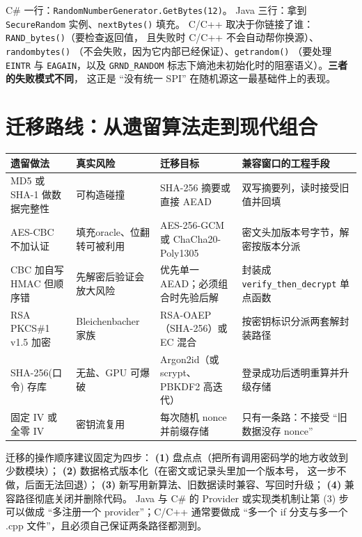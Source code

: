\documentclass[12pt,a4paper,fontset=fandol]{ctexbook}
\newcommand{\Fn}[1]{\texttt{#1()}}
\newcommand{\Tp}[1]{\texttt{#1}}
\newcommand{\CSharp}{C\#}
\newcommand{\CppJava}{C/C++}
\begin{document}
\begin{compare}[title=同一件事的三语言 ``取随机字节'']
\CSharp{} 一行：\Tp{RandomNumberGenerator.GetBytes(12)}。
Java 三行：拿到 \Tp{SecureRandom} 实例、\Fn{nextBytes} 填充。
\CppJava{} 取决于你链接了谁：\Fn{RAND\_bytes}（要检查返回值，
且失败时 \CppJava{} 不会自动帮你换源）、\Fn{randombytes}
（不会失败，因为它内部已经保证）、\Fn{getrandom}
（要处理 \Tp{EINTR} 与 \Tp{EAGAIN}，以及 \Tp{GRND\_RANDOM}
标志下熵池未初始化时的阻塞语义）。\textbf{三者的失败模式不同}，
这正是 ``没有统一 SPI'' 在随机源这一最基础件上的表现。
\end{compare}

\section{迁移路线：从遗留算法走到现代组合}

\begin{footnotesize}
\begin{longtable}{@{}>{\raggedright\arraybackslash}p{}
                  >{\raggedright\arraybackslash}p{}
                  >{\raggedright\arraybackslash}p{}
                  >{\raggedright\arraybackslash}p{}@{}}
\toprule
\textbf{遗留做法} & \textbf{真实风险} & \textbf{迁移目标} &
\textbf{兼容窗口的工程手段} \\
\midrule
MD5 或 SHA-1 做数据完整性 & 可构造碰撞 &
SHA-256 摘要或直接 AEAD &
双写摘要列，读时接受旧值并回填 \\
\addlinespace
AES-CBC 不加认证 & 填充oracle、位翻转可被利用 &
AES-256-GCM 或 ChaCha20-Poly1305 &
密文头加版本号字节，解密按版本分派 \\
\addlinespace
CBC 加自写 HMAC 但顺序错 & 先解密后验证会放大风险 &
优先单一 AEAD；必须组合时先验后解 &
封装成 \texttt{verify\_then\_decrypt} 单点函数 \\
\addlinespace
RSA PKCS\#1 v1.5 加密 & Bleichenbacher 家族 &
RSA-OAEP（SHA-256）或 EC 混合 &
按密钥标识分派两套解封装路径 \\
\addlinespace
SHA-256(口令) 存库 & 无盐、GPU 可爆破 &
Argon2id（或 scrypt、PBKDF2 高迭代） &
登录成功后透明重算并升级存储 \\
\addlinespace
固定 IV 或全零 IV & 密钥流复用 & 每次随机 nonce 并前缀存储 &
只有一条路：不接受 ``旧数据没存 nonce'' \\
\bottomrule
\end{longtable}
\end{footnotesize}

迁移的操作顺序建议固定为四步：
\textbf{(1)} 盘点点（把所有调用密码学的地方收敛到少数模块）；
\textbf{(2)} 数据格式版本化（在密文或记录头里加一个版本号，
这一步不做，后面无法回退）；
\textbf{(3)} 新写用新算法、旧数据读时兼容、写回时升级；
\textbf{(4)} 兼容路径彻底关闭并删除代码。
Java 与 \CSharp{} 的 Provider 或实现类机制让第 (3) 步
可以做成 ``多注册一个 provider''；\CppJava{} 通常要做成
``多一个 if 分支与多一个 .cpp 文件''，且必须自己保证两条路径都测到。
\end{document}
